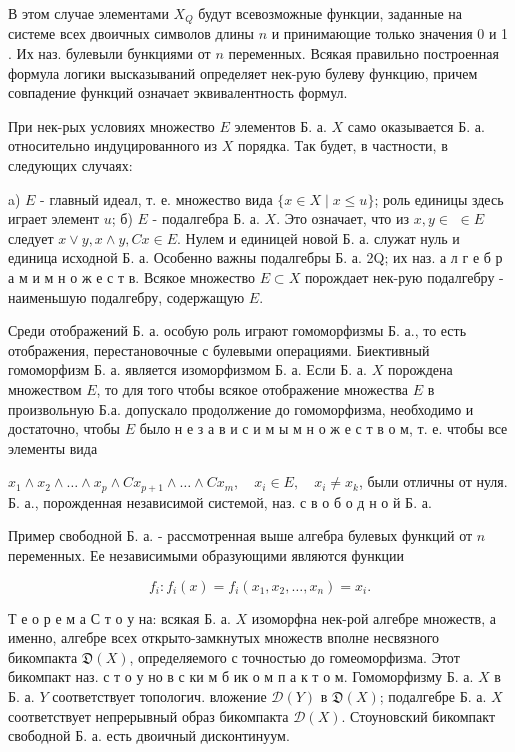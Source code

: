 \documentclass[10pt]{article}
\begin{document}
В этом случае элементами $X_{Q}$ будут всевозможные функции, заданные на системе всех двоичных символов длины $n$ и принимающие только значения 0 и 1 . Их наз. булевыли бункциями от $n$ переменных. Всякая правильно построенная формула логики высказываний определяет нек-рую булеву функцию, причем совпадение функций означает эквивалентность формул.



При нек-рых условиях множество $E$ элементов Б. а. $X$ само оказывается Б. а. относительно индуцированного из $X$ порядка. Так будет, в частности, в следующих случаях:



a) $E$ - главный идеал, т. е. множество вида $\{x \in X \mid x \leqslant u\}$; роль единицы здесь играет элемент $u$; б) $E$ - подалгебра Б. а. $X$. Это означает, что из $x, y \in$ $\in E$ следует $x \vee y, x \wedge y, C x \in E$. Нулем и единицей новой Б. а. служат нуль и единица исходной Б. а. Особенно важны подалгебры Б. а. 2Q; их наз. а л г е б р а м и м н о ж е с т в. Всякое множество $E \subset X$ порождает нек-рую подалгебру - наименьшую подалгебру, содержащую $E$.



Среди отображений Б. а. особую роль играют гомоморфизмы Б. а., то есть отображения, перестановочные с булевыми операциями. Биективный гомоморфизм Б. а. является изоморфизмом Б. а. Если Б. а. $X$ порождена множеством $E$, то для того чтобы всякое отображение множества $E$ в произвольную Б.а. допускало продолжение до гомоморфизма, необходимо и достаточно, чтобы $E$ было н е з а в и с и м ы м н о ж е с т в о м, т. е. чтобы все элементы вида



$x_{1} \wedge x_{2} \wedge \ldots \wedge x_{p} \wedge C x_{p+1} \wedge \ldots \wedge C x_{m}, \quad x_{i} \in E, \quad x_{i} \neq x_{k}$, были отличны от нуля. Б. а., порожденная независимой системой, наз. с в о б о д н о й Б. а.



Пример свободной Б. а. - рассмотренная выше алгебра булевых функций от $n$ переменных. Ее независимыми образующими являются функции



\[

f_{i}: f_{i}(x)=f_{i}\left(x_{1}, x_{2}, \ldots, x_{n}\right)=x_{i} .

\]



Т е о р е м а С т о у на: всякая Б. а. $X$ изоморфна нек-рой алгебре множеств, а именно, алгебре всех открыто-замкнутых множеств вполне несвязного бикомпакта $\mathfrak{D}(X)$, определяемого с точностью до гомеоморфизма. Этот бикомпакт наз. с т о у но в с ки м б ик о м п а к т о м. Гомоморфизму Б. а. $X$ в Б. а. $Y$ соответствует топологич. вложение $\mathscr{D}(Y)$ в $\mathfrak{D}(X)$; подалгебре Б. а. $X$ соответствует непрерывный образ бикомпакта $\mathscr{D}(X)$. Стоуновский бикомпакт свободной Б. а. есть двоичный дисконтинуум.
\end{document}
